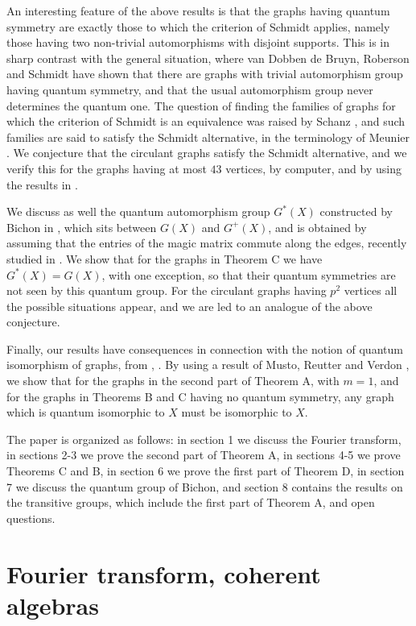 \documentclass[11pt]{amsart}
\begin{document}
An interesting feature of the above results is that the graphs having quantum symmetry are exactly those to which the criterion of Schmidt \cite{sch} applies, namely those having two non-trivial automorphisms with disjoint supports. This is in sharp contrast with the general situation, where van Dobben de Bruyn, Roberson and Schmidt \cite{drs} have shown that there are graphs with trivial automorphism group having quantum symmetry, and that the usual automorphism group never determines the quantum one. The question of finding the families of graphs for which the criterion of Schmidt is an equivalence was raised by Schanz \cite{scz}, and such families are said to satisfy the Schmidt alternative, in the terminology of Meunier \cite{meu}. We conjecture that the circulant graphs satisfy the Schmidt alternative, and we verify this for the graphs having at most $43$ vertices, by computer, and by using the results in \cite{mar}.

We discuss as well the quantum automorphism group $G^*(X)$ constructed by Bichon in \cite{bi1}, which sits between $G(X)$ and $G^+(X)$, and is obtained by assuming that the entries of the magic matrix commute along the edges, recently studied in \cite{hkm}. We show that for the graphs in Theorem C we have $G^*(X)=G(X)$, with one exception, so that their quantum symmetries are not seen by this quantum group. For the circulant graphs having $p^2$ vertices all the possible situations appear, and we are led to an analogue of the above conjecture.

Finally, our results have consequences in connection with the notion of quantum isomorphism of graphs, from \cite{amr}, \cite{lmr}. By using a result of Musto, Reutter and Verdon \cite{mrv}, we show that for the graphs in the second part of Theorem A, with $m=1$, and for the graphs in Theorems B and C having no quantum symmetry, any graph which is quantum isomorphic to $X$ must be isomorphic to $X$.

The paper is organized as follows: in section 1 we discuss the Fourier transform, in sections 2-3 we prove the second part of Theorem A, in sections 4-5 we prove Theorems C and B, in section 6 we prove the first part of Theorem D, in section 7 we discuss the quantum group of Bichon, and section 8 contains the results on the transitive groups, which include the first part of Theorem A, and open questions.

\section{Fourier transform, coherent algebras}
\end{document}
